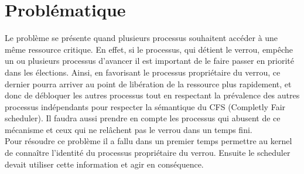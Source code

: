 \section*{Problématique}

Le problème se présente quand plusieurs processus souhaitent accéder à une même
ressource critique. 
En effet, si le processus, qui détient le verrou, empêche un ou plusieurs processus 
d'avancer il est important de le faire passer en priorité dans les 
élections. Ainsi, en favorisant le processus propriétaire du verrou, ce dernier pourra arriver au point de libération de la ressource plus rapidement, et donc de débloquer les autres processus tout en respectant la prévalence des autres processus indépendants pour respecter la 
sémantique du CFS (Completly Fair scheduler).
Il faudra aussi prendre en compte les processus qui abusent de ce mécanisme et 
ceux qui ne relâchent pas le verrou dans un temps fini. 
\\

Pour résoudre ce problème il a fallu dans un premier temps permettre au
kernel de connaître l'identité du processus propriétaire du verrou.
Ensuite le scheduler devait utiliser cette information et agir en conséquence.
\\